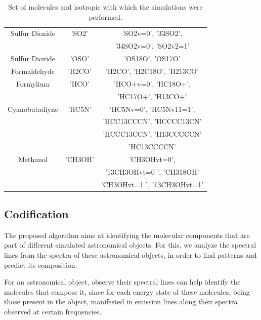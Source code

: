 \documentclass[twocolumn, draft]{emulateapj}
\begin{document}
\begin {table}[H]
\begin{center}
\begin{tabular}{|c|c|c|}
		\hline	Sulfur Dioxide & 'SO2' & 'SO2v=0', '33SO2',\\
		&        &   '34SO2v=0', 'SO2v2=1' \\
		
		\hline	Sulfur Dioxide & 'OSO' & 'OS18O', 'OS17O' \\
		
		\hline	Formaldehyde & 'H2CO'  & 'H2CO', 'H2C18O', 'H213CO' \\
		
		\hline	Formylium & 'HCO'  & 'HCO+v=0', 'HC18O+',\\
		 &        &  'HC17O+', 'H13CO+' \\
		
		
		\hline	Cyanobutadiyne & 'HC5N' & 'HC5Nv=0', 'HC5Nv11=1',\\
		&        &  'HCC13CCCN', 'HCCCC13CN'\\
		&        &  'HCCC13CCN', 'H13CCCCCN'\\
		&        & 'HC13CCCCN' \\
		
		\hline	Methanol & 'CH3OH' & 'CH3OHvt=0',\\
		&        &   '13CH3OHvt=0 ', 'CH318OH' \\
		&      & 'CH3OHvt=1 ', '13CH3OHvt=1'\\
		
		\hline 
	\end{tabular}
	\caption {Set of molecules and isotropic with which the simulations were performed.}
\end{center}
\end{table}


\subsection{Codification}

The proposed algorithm aims at identifying the molecular components that are part of different simulated astronomical objects. For this, we analyze the spectral lines from the spectra of these astronomical objects, in order to find patterns and predict its composition.

For an astronomical object, observe their spectral lines can help identify the molecules that compose it, since for each energy state of these molecules, being those present in the object, manifested in emission lines along their spectra observed at certain frequencies.
\end{document}

